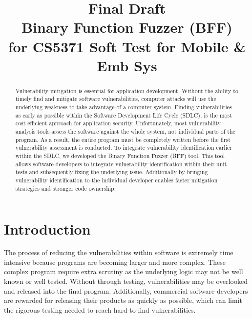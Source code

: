 \documentclass[conference]{IEEEtran}
\begin{document}
\title{Final Draft\\
Binary Function Fuzzer (BFF) \\
for CS5371 Soft Test for Mobile \& Emb Sys}

\author{
}

\maketitle

\begin{abstract}
Vulnerability mitigation is essential for application development. Without the ability to timely find and mitigate software vulnerabilities, computer attacks will use the underlying weakness to take advantage of a computer system. Finding vulnerabilities as early as possible within the Software Development Life Cycle (SDLC), is the most cost efficient approach for application security. Unfortunately, most vulnerability analysis tools assess the software against the whole system, not individual parts of the program. As a result, the entire program must be completely written before the first vulnerability assessment is conducted. To integrate vulnerability identification earlier within the SDLC, we developed the Binary Function Fuzzer (BFF) tool. This tool allows software developers to integrate vulnerability identification within their unit tests and subsequently fixing the underlying issue. Additionally by bringing vulnerability identification to the individual developer enables faster mitigation strategies and stronger code ownership. 
\end{abstract}

\IEEEpeerreviewmaketitle

\section{Introduction}
The process of reducing the vulnerabilities within software is extremely time intensive because programs are becoming larger and more complex. These complex program require extra scrutiny as the underlying logic may not be well known or well tested. Without through testing, vulnerabilities may be overlooked and released into the final program. Additionally, commercial software developers are rewarded for releasing their products as quickly as possible, which can limit the rigorous testing needed to reach hard-to-find vulnerabilities. 
\end{document}
